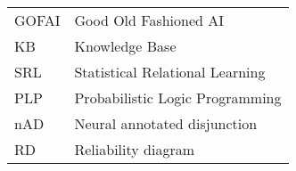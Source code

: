 \begin{flushleft}
\renewcommand{\arraystretch}{1.1}
\begin{tabularx}{\textwidth}{@{}p{12mm}X@{}}
GOFAI & Good Old Fashioned AI \\
KB & Knowledge Base \\
SRL & Statistical Relational Learning \\
PLP & Probabilistic Logic Programming \\
nAD & Neural annotated disjunction \\
RD & Reliability diagram \\
\end{tabularx}
\end{flushleft}
